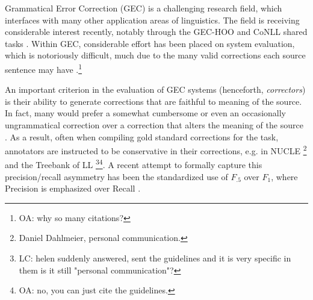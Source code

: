 \documentclass[letter,11pt]{article}
\newcommand{\oa}[1]{\footnote{\color{red}OA: #1}}
\newcommand{\lc}[1]{\footnote{\color{green}LC: #1}}
\begin{document}



Grammatical Error Correction (GEC) is a challenging research field, which interfaces with many
other application areas of linguistics. The field is receiving considerable
interest recently, notably through the GEC-HOO \cite{dale2011helping,dale2012hoo} and
CoNLL shared tasks \cite{kao2013conll,ng2014conll}.
Within GEC, considerable effort has been placed on system evaluation,
which is notoriously difficult,
much due to the many valid corrections each source sentence may have
\cite{tetreault2008native,madnani2011they,chodorow2012problems,dahlmeier2012better}.\oa{why so many citations?}

An important criterion in the evaluation of GEC systems (henceforth, {\it correctors})
is their ability to generate corrections that are faithful to meaning of the source. In fact, many would prefer
a somewhat cumbersome or even an occasionally ungrammatical correction over a correction
that alters the meaning of the source \cite{brockett2006correcting}.
As a result, often when compiling gold standard corrections for the task,
annotators are instructed to be conservative in their corrections, e.g. in NUCLE \footnote{Daniel Dahlmeier, personal communication.} and the Treebank of LL \lc{helen suddenly answered, sent the guidelines and it is very specific in them is it still "personal communication"?}\oa{no, you can just cite the guidelines.}.
A recent attempt to formally capture this precision/recall asymmetry has
been the standardized use of $F_{.5}$ over $F_{1}$, where Precision is
emphasized over Recall \cite{dahlmeier2012better}.
\end{document}
